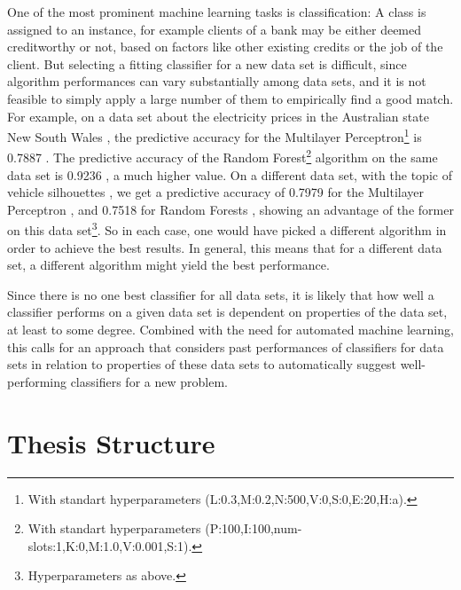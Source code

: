 One of the most prominent machine learning tasks is classification: A class is assigned to an instance, for example clients of a bank may be either deemed creditworthy or not, based on factors like other existing credits or the job of the client. But selecting a fitting classifier for a new data set is difficult, since algorithm performances can vary substantially among data sets, and it is not feasible to simply apply a large number of them to empirically find a good match. For example, on a data set about the electricity prices in the Australian state New South Wales \cite{harris1999splice}, the predictive accuracy for the Multilayer Perceptron\footnote{With standart hyperparameters (L:0.3,M:0.2,N:500,V:0,S:0,E:20,H:a).} is 0.7887 \cite{cachada2017run3}. The predictive accuracy of the Random Forest\footnote{With standart hyperparameters (P:100,I:100,num-slots:1,K:0,M:1.0,V:0.001,S:1).} algorithm on the same data set is 0.9236 \cite{cachada2017run}, a much higher value. On a different data set, with the topic of vehicle silhouettes \cite{siebert1987vehicle}, we get a predictive accuracy of 0.7979 for the Multilayer Perceptron \cite{cachada2017run4}, and 0.7518 for Random Forests \cite{cachada2017run2}, showing an advantage of the former on this data set\footnote{Hyperparameters as above.}. So in each case, one would have picked a different algorithm in order to achieve the best results. In general, this means that for a different data set, a different algorithm might yield the best performance.

Since there is no one best classifier for all data sets, it is likely that how well a classifier performs on a given data set is dependent on properties of the data set, at least to some degree. Combined with the need for automated machine learning, this calls for an approach that considers past performances of classifiers for data sets in relation to properties of these data sets to automatically suggest well-performing classifiers for a new problem.


\section{Thesis Structure}
\label{sec:intro:structure}

